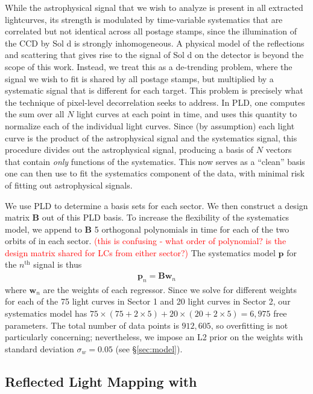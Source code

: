 \documentclass[modern]{aastex62}
\newcommand{\todo}[1]{\textcolor{red}{#1}}
\begin{document}
While the astrophysical signal that we wish to analyze is present in all 
extracted lightcurves, its strength is modulated by time-variable systematics 
that are correlated but not identical across all postage stamps, since the
illumination of the CCD by Sol d is strongly inhomogeneous. A physical
model of the reflections and scattering that gives rise to the
signal of Sol d on the \TESS detector is beyond the scope of this work. Instead,
we treat this as a de-trending problem, where the signal we wish to fit is
shared by all postage stamps, but multiplied by a systematic signal that is
different for each target. This problem is precisely what the technique of
pixel-level decorrelation \citep[PLD;][]{Deming2015, Luger2016, Luger2018a}
seeks to address. In PLD, one computes the sum over all $N$ light curves at each
point in time, and uses this quantity to normalize each of the individual
light curves. Since (by assumption) each light curve is the product of the astrophysical
signal and the systematics signal, this procedure divides out the astrophysical
signal, producing a basis of $N$ vectors that contain \emph{only} functions of the
systematics. This now serves as a ``clean'' basis one can then use to fit the 
systematics component of the data, with minimal risk of fitting out astrophysical signals. 

We use PLD to determine a basis sets for each \TESS sector. 
We then construct a design matrix $\mathbf{B}$ out of this PLD basis. To
increase the flexibility of the systematics model, we append to $\mathbf{B}$ 5 orthogonal
polynomials in time for each of the two orbits of \TESS in each sector. 
\todo{(this is confusing - what order of polynomial? 
is the design matrix shared for LCs from either sector?)}
The systematics model $\mathbf{p}$ for the $n^\mathrm{th}$ signal is thus
%
\begin{align}
\mathbf{p}_n = \mathbf{B} \mathbf{w}_n
\end{align}
%
where $\mathbf{w}_n$ are the weights of each regressor.
Since we solve for different weights for each of the 75 light curves in Sector 1
and 20 light curves in Sector 2, our systematics model has
$75 \times (75 + 2 \times 5) + 20 \times (20 + 2 \times 5) = 6,975$ free parameters.
The total number of data points is $912,605$, so overfitting is not particularly
concerning; nevertheless, we impose an L2 prior on the weights with
standard deviation $\sigma_w = 0.05$ (see \S\ref{sec:model}).

\subsection{Reflected Light Mapping with \starry}
\label{sec:starry}
\end{document}
